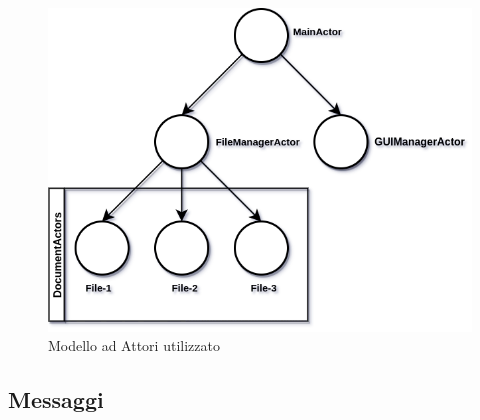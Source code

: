 \begin{figure}[H]
	\begin{center}
		\includegraphics[width=0.8\linewidth]{img/part-1/Actors.png}
	\end{center}
	\caption{Modello ad Attori utilizzato}
\end{figure}

\subsection{Messaggi}

